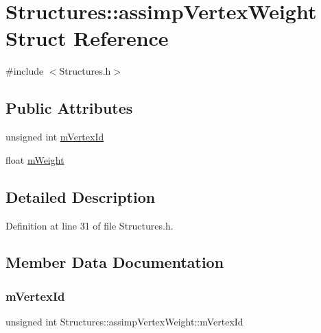 \hypertarget{struct_structures_1_1assimp_vertex_weight}{}\section{Structures\+:\+:assimp\+Vertex\+Weight Struct Reference}
\label{struct_structures_1_1assimp_vertex_weight}


{\ttfamily \#include $<$Structures.\+h$>$}

\subsection*{Public Attributes}
\begin{DoxyCompactItemize}
\item 
unsigned int \mbox{\hyperlink{struct_structures_1_1assimp_vertex_weight_af93289626ba7a216a3cb4ce4a92b8333}{m\+Vertex\+Id}}
\item 
float \mbox{\hyperlink{struct_structures_1_1assimp_vertex_weight_a02fe67c2f228670a7119f6cf8413be40}{m\+Weight}}
\end{DoxyCompactItemize}


\subsection{Detailed Description}


Definition at line 31 of file Structures.\+h.



\subsection{Member Data Documentation}
\mbox{\label{struct_structures_1_1assimp_vertex_weight_af93289626ba7a216a3cb4ce4a92b8333}} 
\subsubsection{\texorpdfstring{m\+Vertex\+Id}{mVertexId}}
{\footnotesize\ttfamily unsigned int Structures\+::assimp\+Vertex\+Weight\+::m\+Vertex\+Id}



